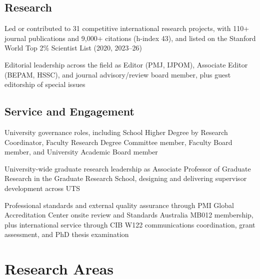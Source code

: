 \documentclass[11pt,a4paper]{report} %
\newcommand{\listitemspace}{0.25em}
\renewenvironment{itemize}
{\begin{list}{}{\setlength{\leftmargin}{0em}
                \setlength{\parskip}{0em}
                \setlength{\itemsep}{\listitemspace}
                \setlength{\parsep}{\listitemspace}}}
{\end{list}}
\begin{document}
    \subsection*{Research}
    
    \begin{itemize}
    
        \item Led or contributed to 31 competitive international research projects, with 110+ journal publications and 9,000+ citations (h-index 43), and listed on the Stanford World Top 2\% Scientist List (2020, 2023--26)
        
        \item Editorial leadership across the field as Editor (PMJ, IJPOM), Associate Editor (BEPAM, HSSC), and journal advisory/review board member, plus guest editorship of special issues
        
    \end{itemize}
    
    \subsection*{Service and Engagement}
    
    \begin{itemize}
    
        \item University governance roles, including School Higher Degree by Research Coordinator, Faculty Research Degree Committee member, Faculty Board member, and University Academic Board member

        \item University-wide graduate research leadership as Associate Professor of Graduate Research in the Graduate Research School, designing and delivering supervisor development across UTS
        
        \item Professional standards and external quality assurance through PMI Global Accreditation Center onsite review and Standards Australia MB012 membership, plus international service through CIB W122 communications coordination, grant assessment, and PhD thesis examination  
        
    \end{itemize}



    \section*{Research Areas}
\end{document}
